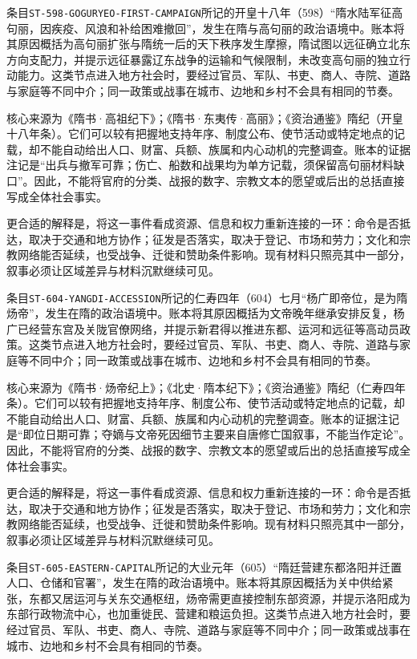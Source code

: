 条目\texttt{ST-598-GOGURYEO-FIRST-CAMPAIGN}所记的开皇十八年（598）“隋水陆军征高句丽，因疾疫、风浪和补给困难撤回”，发生在隋与高句丽的政治语境中。账本将其原因概括为高句丽扩张与隋统一后的天下秩序发生摩擦，隋试图以远征确立北东方向支配力，并提示远征暴露辽东战争的运输和气候限制，未改变高句丽的独立行动能力。这类节点进入地方社会时，要经过官员、军队、书吏、商人、寺院、道路与家庭等不同中介；同一政策或战事在城市、边地和乡村不会具有相同的节奏。

核心来源为《隋书·高祖纪下》；《隋书·东夷传·高丽》；《资治通鉴》隋纪（开皇十八年条）。它们可以较有把握地支持年序、制度公布、使节活动或特定地点的记载，却不能自动给出人口、财富、兵额、族属和内心动机的完整调查。账本的证据注记是“出兵与撤军可靠；伤亡、船数和战果均为单方记载，须保留高句丽材料缺口”。因此，不能将官府的分类、战报的数字、宗教文本的愿望或后出的总括直接写成全体社会事实。

更合适的解释是，将这一事件看成资源、信息和权力重新连接的一环：命令是否抵达，取决于交通和地方协作；征发是否落实，取决于登记、市场和劳力；文化和宗教网络能否延续，也受战争、迁徙和赞助条件影响。现有材料只照亮其中一部分，叙事必须让区域差异与材料沉默继续可见。


条目\texttt{ST-604-YANGDI-ACCESSION}所记的仁寿四年（604）七月“杨广即帝位，是为隋炀帝”，发生在隋的政治语境中。账本将其原因概括为文帝晚年继承安排反复，杨广已经营东宫及关陇官僚网络，并提示新君得以推进东都、运河和远征等高动员政策。这类节点进入地方社会时，要经过官员、军队、书吏、商人、寺院、道路与家庭等不同中介；同一政策或战事在城市、边地和乡村不会具有相同的节奏。

核心来源为《隋书·炀帝纪上》；《北史·隋本纪下》；《资治通鉴》隋纪（仁寿四年条）。它们可以较有把握地支持年序、制度公布、使节活动或特定地点的记载，却不能自动给出人口、财富、兵额、族属和内心动机的完整调查。账本的证据注记是“即位日期可靠；夺嫡与文帝死因细节主要来自唐修亡国叙事，不能当作定论”。因此，不能将官府的分类、战报的数字、宗教文本的愿望或后出的总括直接写成全体社会事实。

更合适的解释是，将这一事件看成资源、信息和权力重新连接的一环：命令是否抵达，取决于交通和地方协作；征发是否落实，取决于登记、市场和劳力；文化和宗教网络能否延续，也受战争、迁徙和赞助条件影响。现有材料只照亮其中一部分，叙事必须让区域差异与材料沉默继续可见。


条目\texttt{ST-605-EASTERN-CAPITAL}所记的大业元年（605）“隋廷营建东都洛阳并迁置人口、仓储和官署”，发生在隋的政治语境中。账本将其原因概括为关中供给紧张，东都又居运河与关东交通枢纽，炀帝需更直接控制东部资源，并提示洛阳成为东部行政物流中心，也加重徙民、营建和粮运负担。这类节点进入地方社会时，要经过官员、军队、书吏、商人、寺院、道路与家庭等不同中介；同一政策或战事在城市、边地和乡村不会具有相同的节奏。


